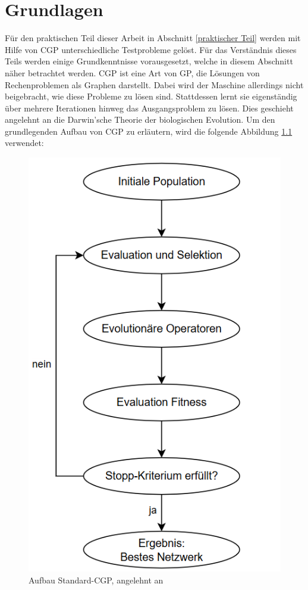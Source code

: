 \chapter{Grundlagen}
\label{Grundlagen}

Für den praktischen Teil dieser Arbeit in Abschnitt \ref{praktischer Teil} werden mit Hilfe von CGP unterschiedliche Testprobleme gelöst. 
Für das Verständnis dieses Teils werden einige Grundkenntnisse vorausgesetzt, welche in diesem Abschnitt näher betrachtet werden.\newline
CGP ist eine Art von GP, die Lösungen von Rechenproblemen als Graphen darstellt. \cite{miller_cartesian_2020}
Dabei wird der Maschine allerdings nicht beigebracht, wie diese Probleme zu lösen sind.
Stattdessen lernt sie eigenständig über mehrere Iterationen hinweg das Ausgangsproblem zu lösen.
Dies geschieht angelehnt an die Darwin’sche Theorie der biologischen Evolution. \cite{milad_taleby_ahvanooey_survey_2019} \newline
Um den grundlegenden Aufbau von CGP zu erläutern, wird die folgende Abbildung \ref{fig:aufbauCGP} verwendet:

\begin{figure}[H]
    \centering
    \includegraphics[scale = 0.43]{Bilder/AufbauCGPVorgehenNachbildung.png}
    \caption{Aufbau Standard-CGP, angelehnt an \cite{torabi_using_2022}}
    \label{fig:aufbauCGP}
\end{figure}

